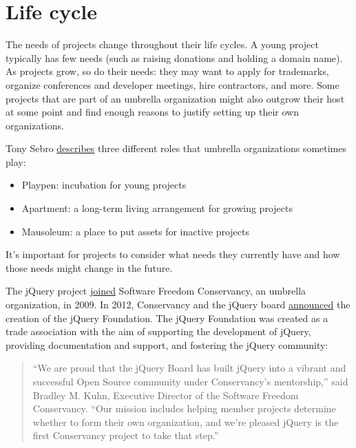 


\chapter{Life cycle}

The needs of projects change throughout their life cycles.  A young project typically has few needs (such as raising donations and holding a domain name).  As projects grow, so do their needs: they may want to apply for trademarks, organize conferences and developer meetings, hire contractors, and more.  Some projects that are part of an umbrella organization might also outgrow their host at some point and find enough reasons to justify setting up their own organizations.

Tony Sebro \href{https://lwn.net/Articles/548542/}{describes} three different roles that umbrella organizations sometimes play:

\begin{itemize}

\item Playpen: incubation for young projects

\item Apartment: a long-term living arrangement for growing projects

\item Mausoleum: a place to put assets for inactive projects

\end{itemize}

It's important for projects to consider what needs they currently have and how those needs might change in the future.

\begin{kaobox}[frametitle=jQuery and the jQuery Foundation]

The jQuery project \href{https://sfconservancy.org/news/2009/nov/30/jQuery-joins/}{joined} Software Freedom Conservancy, an umbrella organization, in 2009.  In 2012, Conservancy and the jQuery board \href{https://sfconservancy.org/news/2012/mar/06/jQuery-Foundation/}{announced} the creation of the jQuery Foundation.  The jQuery Foundation was created as a trade association with the aim of supporting the development of jQuery, providing documentation and support, and fostering the jQuery community:

\begin{quote}

``We are proud that the jQuery Board has built jQuery into a vibrant and successful Open Source community under Conservancy's mentorship,'' said Bradley M. Kuhn, Executive Director of the Software Freedom Conservancy.  ``Our mission includes helping member projects determine whether to form their own organization, and we're pleased jQuery is the first Conservancy project to take that step.''

\end{quote}

\end{kaobox}

